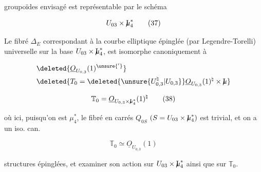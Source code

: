 
groupoïdes envisagé est représentable par le schéma

\[
U_{03}\times \mathord{\mathrm{I}\mkern-7mu\mu}_4^*
\tag*{(37)}
\]

Le fibré $\Delta_E$ correspondant à la courbe elliptique épinglée (par Legendre-Torelli) universelle sur la base $U_{03}\times \mathord{\mathrm{I}\mkern-7mu\mu}_4^*$, est isomorphe canoniquement à

\[
\begin{aligned}
&\deleted{\underline O_{U_{0,3}}(1)^{\unsure{'}}}\\
&\deleted{T_0=\deleted{\unsure{U_{0,3}^{\natural}|U_{0,3}}}\underline O_{U_{0,3}}(1)^\natural\times \mathord{\mathrm{I}\mkern-7mu\mu}}
\end{aligned}
\]

\[
\mathbb{T}_0=\underline O_{U_{0,3}\times \mathord{\mathrm{I}\mkern-7mu\mu}_4^*}(1)^{\natural}
\tag*{(38)}
\]

où ici, puisqu'on est   $\mu_4^*$, le fibré en carrés $Q_{0S}$ $(S=U_{03}\times \mathord{\mathrm{I}\mkern-7mu\mu}_4^*)$ est trivial, et on a un iso. can.

\[
\mathbb{T}_0\simeq\underline O_{U_{0,3}}(1)
\tag*{(39)}
\]

  structures épinglées, et examiner son action sur $U_{03}\times \mathord{\mathrm{I}\mkern-7mu\mu}_4^*$ ainsi que sur $\mathbb{T}_0$.

